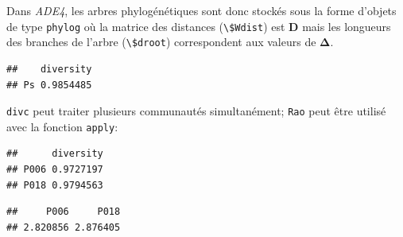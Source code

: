 \documentclass[
  11pt,
  french,
  a4paper,
  extrafontsizes,onecolumn,openright
  ]{memoir}
\newenvironment{Shaded}{\begin{snugshade}}{\end{snugshade}}
\newcommand{\AttributeTok}[1]{\textcolor[rgb]{0.13,0.29,0.53}{#1}}
\newcommand{\DecValTok}[1]{\textcolor[rgb]{0.00,0.00,0.81}{#1}}
\newcommand{\FunctionTok}[1]{\textcolor[rgb]{0.13,0.29,0.53}{\textbf{#1}}}
\newcommand{\NormalTok}[1]{#1}
\newcommand{\SpecialCharTok}[1]{\textcolor[rgb]{0.81,0.36,0.00}{\textbf{#1}}}
\newcommand{\StringTok}[1]{\textcolor[rgb]{0.31,0.60,0.02}{#1}}
\begin{document}
Dans \emph{ADE4}, les arbres phylogénétiques sont donc stockés sous la forme d'objets de type \texttt{phylog} où la matrice des distances (\texttt{\textbackslash{}\$Wdist}) est \(\mathbf{D}\) mais les longueurs des branches de l'arbre (\texttt{\textbackslash{}\$droot}) correspondent aux valeurs de \(\mathbf{\Delta}\).

\scriptsize

\begin{Shaded}
\end{Shaded}

\begin{verbatim}
##    diversity
## Ps 0.9854485
\end{verbatim}

\normalsize

\texttt{divc} peut traiter plusieurs communautés simultanément; \texttt{Rao} peut être utilisé avec la fonction \texttt{apply}:

\scriptsize

\begin{Shaded}
\end{Shaded}

\begin{verbatim}
##      diversity
## P006 0.9727197
## P018 0.9794563
\end{verbatim}

\begin{Shaded}
\end{Shaded}

\begin{verbatim}
##     P006     P018 
## 2.820856 2.876405
\end{verbatim}
\end{document}
